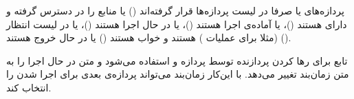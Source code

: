 پردازه‌های
یا صرفا در لیست پردازه‌ها قرار گرفته‌اند
()
یا منابع را در دسترس گرفته و دارای
هستند
()،
یا آماده‌ی اجرا هستند
()،
یا در حال اجرا هستند
()،
یا در لیست انتظار (مثلا برای عملیات
)
هستند و خواب هستند
()
یا در حال خروج هستند
().

تابع
برای رها کردن پردازنده توسط پردازه و استفاده می‌شود و متن در حال اجرا را به متن زمان‌بند تغییر می‌دهد. با این‌کار زمان‌بند می‌تواند پردازه‌ی بعدی برای اجرا شدن را انتخاب کند.